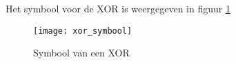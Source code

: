 Het symbool voor de XOR is weergegeven in figuur \ref{symbool:xor}

\begin{figure}[h]
\texttt{[image: xor\_symbool]}
\centering
\caption{Symbool van een XOR}
\label{symbool:xor}
\end{figure}

